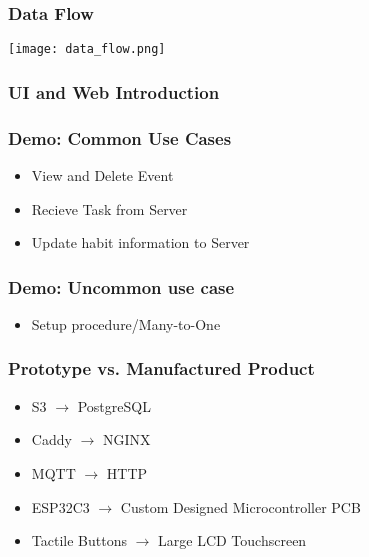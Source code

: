 \documentclass{beamer}
\begin{document}
\frame{\titlepage}

\begin{frame}
  \frametitle{Data Flow}
    \begin{center}
        \texttt{[image: data\_flow.png]}
    \end{center}
\end{frame}

\begin{frame}
  \frametitle{UI and Web Introduction}
\end{frame}

\begin{frame}
  \frametitle{Demo: Common Use Cases}
  \begin{itemize}
    \item View and Delete Event
    \item Recieve Task from Server
    \item Update habit information to Server
  \end{itemize}
\end{frame}

\begin{frame}
  \frametitle{Demo: Uncommon use case}
  \begin{itemize}
    \item Setup procedure/Many-to-One
  \end{itemize}
\end{frame}

\begin{frame}
  \frametitle{Prototype vs. Manufactured Product}
  \begin{itemize}
    \item S3 \(\rightarrow\) PostgreSQL
    \item Caddy \(\rightarrow\) NGINX
    \item MQTT \(\rightarrow\) HTTP
    \item ESP32C3 \(\rightarrow\) Custom Designed Microcontroller PCB
    \item Tactile Buttons \(\rightarrow\) Large LCD Touchscreen
  \end{itemize}
\end{frame}
\end{document}

